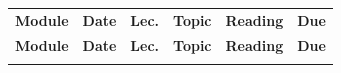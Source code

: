 \documentclass{syllabus}
\begin{document}
{\renewcommand{\arraystretch}{1.15}
\setlength{\tabcolsep}{4pt}
\setlength{\aboverulesep}{0pt}
\setlength{\belowrulesep}{0pt}
\setlength{\cmidrulewidth}{\arrayrulewidth}
\begin{center}
\begin{xltabular}{\textwidth}{|C{2.2cm}|C{1.25cm}|C{0.7cm}|X|C{1.85cm}|C{1.85cm}|}
\Xhline{1.75\arrayrulewidth}
\textbf{Module} & \textbf{Date} & \textbf{Lec.} & \textbf{Topic}  & \textbf{Reading} & \textbf{Due}  \\
\Xhline{1.75\arrayrulewidth}
\endfirsthead
\Xhline{1.75\arrayrulewidth}
\textbf{Module} & \textbf{Date} & \textbf{Lec.} & \textbf{Topic}  & \textbf{Reading} & \textbf{Due}  \\
\Xhline{1.75\arrayrulewidth}
\endhead
\Xhline{1.75\arrayrulewidth}
\endlastfoot

\end{xltabular}
\end{center}
}
\end{document}
